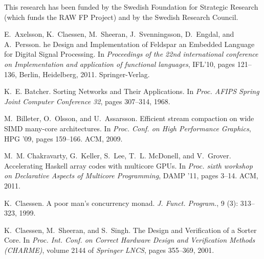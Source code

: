 \documentclass[]{sigplanconf}
\begin{document}
\acks
This research has been funded by the Swedish Foundation for Strategic Research (which funds
the RAW FP Project) and
by the Swedish Research Council.



%
%


\begin{thebibliography}{}
\softraggedright

E.~Axelsson, K.~Claessen, M.~Sheeran, J.~Svenningsson, D.~Engdal, and
  A.~Persson.
he {D}esign and {I}mplementation of {F}eldspar an {E}mbedded
  {L}anguage for {D}igital {S}ignal {P}rocessing.
\newblock In \emph{Proceedings of the 22nd international conference on
  Implementation and application of functional languages}, IFL'10, pages
  121--136, Berlin, Heidelberg, 2011. Springer-Verlag.

K.~E. Batcher.
\newblock Sorting {N}etworks and {T}heir {A}pplications.
\newblock In \emph{Proc. AFIPS Spring Joint Computer Conference 32}, pages
  307--314, 1968.

M.~Billeter, O.~Olsson, and U.~Assarsson.
\newblock Efficient stream compaction on wide {SIMD} many-core architectures.
\newblock In \emph{Proc. Conf. on High Performance Graphics}, HPG '09, pages
  159--166. ACM, 2009.

M.~M. Chakravarty, G.~Keller, S.~Lee, T.~L. McDonell, and V.~Grover.
\newblock Accelerating {H}askell array codes with multicore {GPU}s.
\newblock In \emph{Proc. sixth workshop on {D}eclarative {A}spects of
  {M}ulticore {P}rogramming}, DAMP '11, pages 3--14. ACM, 2011.

K.~Claessen.
\newblock A poor man's concurrency monad.
\newblock \emph{J. Funct. Program.}, 9 (3): 313--323, 1999.

K.~Claessen, M.~Sheeran, and S.~Singh.
\newblock The {D}esign and {V}erification of a {S}orter {C}ore.
\newblock In \emph{Proc. Int. Conf. on Correct Hardware Design and Verification
  Methods (CHARME)}, volume 2144 of \emph{Springer LNCS}, pages 355--369, 2001.


\end{thebibliography}
\end{document}
